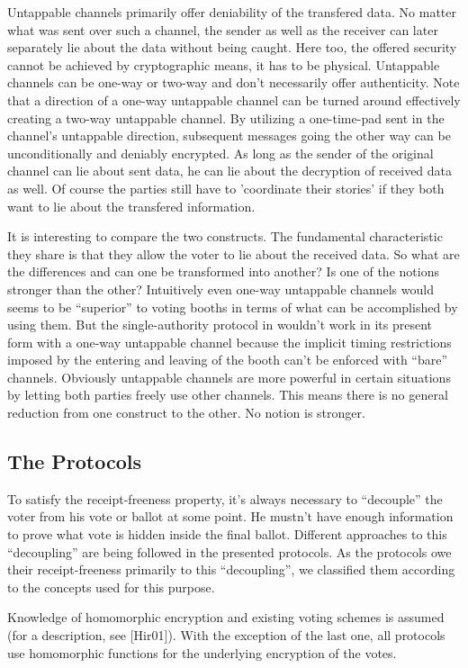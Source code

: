 \documentclass{article}
\begin{document}
Untappable channels primarily offer deniability of the transfered data. No matter what was sent over such a channel, the sender as well as the receiver can later separately lie about the data without being caught. Here too, the offered security cannot be achieved by cryptographic means, it has to be physical.
Untappable channels can be one-way or two-way and don't necessarily offer authenticity. Note that a direction of a one-way untappable channel can be turned around effectively creating a two-way untappable channel. By utilizing a one-time-pad sent in the channel's untappable direction, subsequent messages going the other way can be unconditionally and deniably encrypted. As long as the sender of the original channel can lie about sent data, he can lie about the decryption of received data as well. Of course the parties still have to 'coordinate their stories' if they both want to lie about the transfered information.

It is interesting to compare the two constructs. The fundamental characteristic they share is that they allow the voter to lie about the received data. So what are the differences and can one be transformed into another? Is one of the notions stronger than the other? Intuitively even one-way untappable channels would seems to be ``superior'' to voting booths in terms of what can be accomplished by using them. But the single-authority protocol in \cite{BenTui94} wouldn't work in its present form with a one-way untappable channel because the implicit timing restrictions imposed by the entering and leaving of the booth can't be enforced with ``bare'' channels. Obviously untappable channels are more powerful in certain situations by letting both parties freely use other channels. This means there is no general reduction from one construct to the other. No notion is stronger.


\subsection{The Protocols}
To satisfy the receipt-freeness property, it's always necessary to ``decouple'' the voter from his vote or ballot at some point. He mustn't have enough information to prove what vote is hidden inside the final ballot. Different approaches to this ``decoupling'' are being followed in the presented protocols. As the protocols owe their receipt-freeness primarily to this ``decoupling'', we classified them according to the concepts used for this purpose.

Knowledge of homomorphic encryption and existing voting schemes is assumed (for a description, see [Hir01]). With the exception of the last one, all protocols use homomorphic functions for the underlying encryption of the votes.
\end{document}
